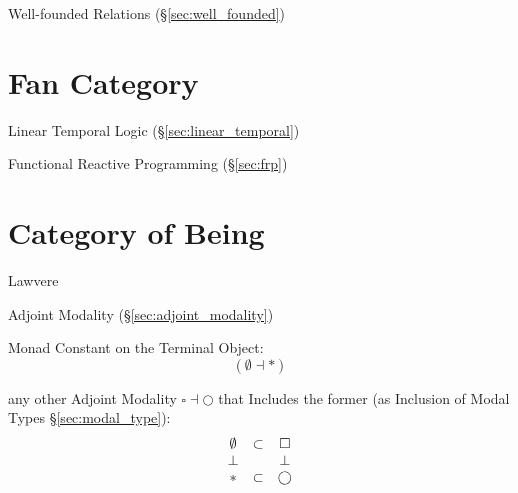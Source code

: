 Well-founded Relations (\S\ref{sec:well_founded})



\section{Fan Category}\label{sec:fan_category}


Linear Temporal Logic (\S\ref{sec:linear_temporal})

Functional Reactive Programming (\S\ref{sec:frp})



\section{Category of Being}\label{sec:category_of_being}

Lawvere

Adjoint Modality (\S\ref{sec:adjoint_modality})

Monad Constant on the Terminal Object:
\[
  (\emptyset \dashv *)
\]

any other Adjoint Modality $\square \dashv \bigcirc$ that Includes the
former (as Inclusion of Modal Types \S\ref{sec:modal_type}):
\[
  \begin{matrix}
    \emptyset & \subset & \square \\
    \bot & \empty & \bot \\
    * & \subset & \bigcirc
  \end{matrix}
\]
